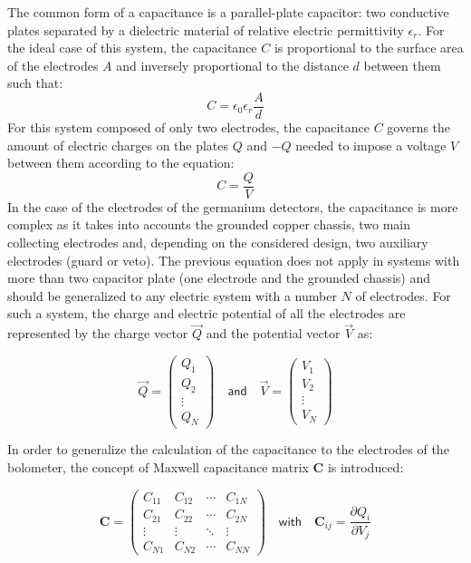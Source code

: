 The common form of a capacitance is a parallel-plate capacitor: two conductive plates separated by a dielectric material of relative electric permittivity $\epsilon_r$. For the ideal case of this system, the capacitance $C$ is proportional to the surface area of the electrodes $A$ and inversely proportional to the distance $d$ between them  such that:
\begin{equation}
C = \epsilon_0 \epsilon_r \frac{A}{d}
\end{equation}
For this system composed of only two electrodes, the capacitance $C$ governs the amount of electric charges on the plates $Q$ and $-Q$ needed to impose a voltage $V$ between them according to the equation:
 \begin{equation}
 \label{eq:capacitance-definition-simple}
C = \frac{Q}{V}
\end{equation}
In the case of the electrodes of the germanium detectors, the capacitance is more complex as it takes into accounts the grounded copper chassis, two main collecting electrodes and, depending on the considered design, two auxiliary electrodes (guard or veto). The previous equation does not apply in systems with more than two capacitor plate (one electrode and the grounded chassis) and should be generalized to any electric system with a number $N$ of electrodes. For such a system, the charge and electric potential of all the electrodes are represented by the charge vector $\vec{Q}$ and the potential vector $\vec{V}$ as:

\begin{equation} 
\label{eq:vector-charge-potential}
\vec{Q} = 
\begin{pmatrix}
Q_{1} \\ 
Q_{2} \\ 
\vdots \\ 
Q_{N}
\end{pmatrix} 
\quad \textsf{and} \quad
\vec{V} = 
\begin{pmatrix}
V_{1} \\ 
V_{2} \\ 
\vdots \\
V_{N}
\end{pmatrix} 
\end{equation}

In order to generalize the calculation of the capacitance to the electrodes of the bolometer, the concept of Maxwell capacitance matrix $\bm{C}$ is introduced:

\begin{equation} 
\label{eq:maxwell-capacitance-matrix}
\bm{C} = 
\begin{pmatrix}
C_{11} & C_{12} & \cdots & C_{1N} \\ 
C_{21} & C_{22} & \cdots & C_{2N} \\ 
\vdots & \vdots & \ddots & \vdots \\ 
C_{N1} & C_{N2} & \cdots & C_{NN}
\end{pmatrix}
\quad \textsf{with} \quad
\bm{C}_{ij} = \frac{\partial Q_i}{\partial V_j}
\end{equation}


